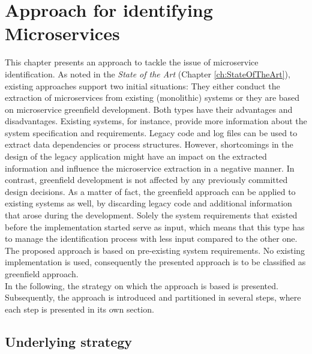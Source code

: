 \chapter{Approach for identifying Microservices}
\label{ch:Solution}
This chapter presents an approach to tackle the issue of microservice identification. 
As noted in the \textit{State of the Art} (Chapter \ref{ch:StateOfTheArt}), existing approaches support two initial situations: They either conduct the extraction of microservices from existing (monolithic) systems or they are based on microservice greenfield development. Both types have their advantages and disadvantages. Existing systems, for instance, provide more information about the system specification and requirements. Legacy code and log files can be used to extract data dependencies or process structures. However, shortcomings in the design of the legacy application might have an impact on the extracted information and influence the microservice extraction in a negative manner. In contrast, greenfield development is not affected by any previously committed design decisions. As a matter of fact, the greenfield approach can be applied to existing systems as well, by discarding legacy code and additional information that arose during the development. Solely the system requirements that existed before the implementation started serve as input, which means that this type has to manage the identification process with less input compared to the other one.\\
The proposed approach is based on pre-existing system requirements. No existing implementation is used, consequently the presented approach is to be classified as greenfield approach.\\
In the following, the strategy on which the approach is based is presented. Subsequently, the approach is introduced and partitioned in several steps, where each step is presented in its own section.



\section{Underlying strategy}

